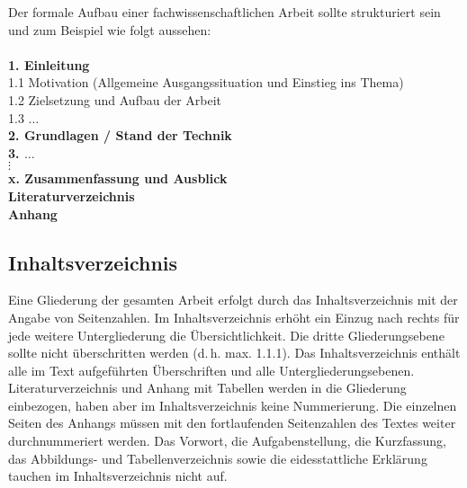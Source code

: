 Der formale Aufbau einer fachwissenschaftlichen Arbeit sollte strukturiert sein und zum Beispiel wie folgt aussehen:
\\
\\
\noindent
\textbf{1. Einleitung} \\
1.1 Motivation (Allgemeine Ausgangssituation und Einstieg ins Thema) \\
1.2 Zielsetzung und Aufbau der Arbeit \\
1.3 $\ldots$ \\
\textbf{2. Grundlagen / Stand der Technik}  \\
\textbf{3. $\ldots$ }\\
$\vdots$ \\
\textbf{x. Zusammenfassung und Ausblick} \\
\textbf{Literaturverzeichnis} \\
\textbf{Anhang} \\

\subsection{Inhaltsverzeichnis}
\label{sub:Inhaltsverzeichnis}

Eine Gliederung der gesamten Arbeit erfolgt durch das Inhaltsverzeichnis mit der Angabe von Seitenzahlen. Im Inhaltsverzeichnis erhöht ein Einzug nach rechts für jede weitere Untergliederung die Übersichtlichkeit. Die dritte Gliederungsebene sollte nicht überschritten werden (d.\,h. max. 1.1.1).
Das Inhaltsverzeichnis enthält alle im Text aufgeführten Überschriften und alle Untergliederungsebenen. Literaturverzeichnis und Anhang mit Tabellen werden in die Gliederung einbezogen, haben aber im Inhaltsverzeichnis keine Nummerierung. Die einzelnen Seiten des Anhangs müssen mit den fortlaufenden Seitenzahlen des Textes weiter durchnummeriert werden.
Das Vorwort, die Aufgabenstellung, die Kurzfassung, das Abbildungs- und Tabellenverzeichnis sowie die eidesstattliche Erklärung tauchen im Inhaltsverzeichnis nicht auf.

